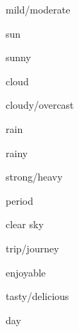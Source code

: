 \begin{flashcard}{\LARGE mild/moderate}
\LARGE {}
\end{flashcard}
\begin{flashcard}{\LARGE sun}
\LARGE {}
\end{flashcard}
\begin{flashcard}{\LARGE sunny}
\LARGE {}
\end{flashcard}
\begin{flashcard}{\LARGE cloud}
\LARGE {}
\end{flashcard}
\begin{flashcard}{\LARGE cloudy/overcast}
\LARGE {}
\end{flashcard}
\begin{flashcard}{\LARGE rain}
\LARGE {}
\end{flashcard}
\begin{flashcard}{\LARGE rainy}
\LARGE {}
\end{flashcard}
\begin{flashcard}{\LARGE strong/heavy}
\LARGE {}
\end{flashcard}
\begin{flashcard}{\LARGE period}
\LARGE {}
\end{flashcard}
\begin{flashcard}{\LARGE clear sky}
\LARGE {}
\end{flashcard}
\begin{flashcard}{\LARGE trip/journey}
\LARGE {}
\end{flashcard}
\begin{flashcard}{\LARGE enjoyable}
\LARGE {}
\end{flashcard}
\begin{flashcard}{\LARGE tasty/delicious}
\LARGE {}
\end{flashcard}
\begin{flashcard}{\LARGE day}
\LARGE {}
\end{flashcard}
